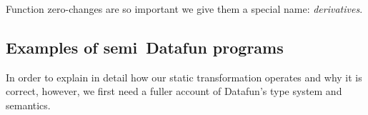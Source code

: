 \noindent
Function zero-changes are so important we give them a special name:
\emph{derivatives}.







\subsection{Examples of semi\naive\ Datafun programs}
\XXX

In order to explain in detail how our static transformation operates and why it
is correct, however, we first need a fuller account of Datafun's type system and
semantics.
